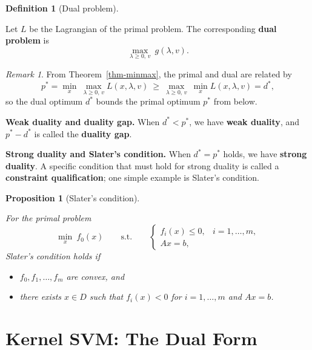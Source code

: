 \documentclass[
  letterpaper,
  DIV=11,
  numbers=noendperiod]{scrreprt}
\providecommand{\tightlist}{%
  \setlength{\itemsep}{0pt}\setlength{\parskip}{0pt}}
\theoremstyle{definition}
\newtheorem{definition}{Definition}[chapter]
\theoremstyle{plain}
\theoremstyle{plain}
\newtheorem{proposition}{Proposition}[chapter]
\theoremstyle{definition}
\theoremstyle{plain}
\theoremstyle{plain}
\theoremstyle{remark}
\newtheorem*{remark}{Remark}
\begin{document}
\begin{definition}[Dual
problem]\protect\hypertarget{def-dual-problem}{}\label{def-dual-problem}

Let \(L\) be the Lagrangian of the primal problem. The corresponding
\textbf{dual problem} is \[
\max_{\lambda \ge 0,\, v} \ g(\lambda, v) .
\]

\end{definition}

\begin{remark}
From Theorem~\ref{thm-minmax}, the primal and dual are related by \[
p^\ast = \min_x \ \max_{\lambda \ge 0,\, v} L(x, \lambda, v)
\ \ge\
\max_{\lambda \ge 0,\, v} \ \min_x L(x, \lambda, v) = d^\ast ,
\] so the dual optimum \(d^\ast\) bounds the primal optimum \(p^\ast\)
from below.
\end{remark}

\textbf{Weak duality and duality gap.} When \(d^\ast < p^\ast\), we have
\textbf{weak duality}, and \(p^\ast - d^\ast\) is called the
\textbf{duality gap}.

\textbf{Strong duality and Slater's condition.} When \(d^\ast = p^\ast\)
holds, we have \textbf{strong duality}. A specific condition that must
hold for strong duality is called a \textbf{constraint qualification};
one simple example is Slater's condition.

\begin{proposition}[Slater's
condition]\protect\hypertarget{prp-slater}{}\label{prp-slater}

For the primal problem \[
\min_x \ f_0(x)
\qquad\text{s.t.}\qquad
\begin{cases}
f_i(x) \le 0, & i = 1, \dots, m, \\
A x = b,
\end{cases}
\] Slater's condition holds if

\begin{itemize}
\tightlist
\item
  \(f_0, f_1, \dots, f_m\) are convex, and
\item
  there exists \(x \in D\) such that \(f_i(x) < 0\) for
  \(i = 1, \dots, m\) and \(Ax = b\).
\end{itemize}

\end{proposition}

\section{Kernel SVM: The Dual Form}\label{kernel-svm-the-dual-form}
\end{document}
